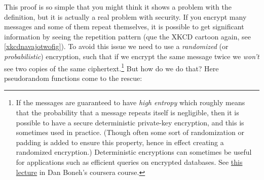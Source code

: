 This proof is so simple that you might think it shows a problem with the
definition, but it is actually a real problem with security. If you
encrypt many messages and some of them repeat themselves, it is possible
to get significant information by seeing the repetition pattern (que the
XKCD cartoon again, see \cref{xkcdnavajotwofig}). To avoid this issue we
need to use a \emph{randomized} (or \emph{probabilistic}) encryption,
such that if we encrypt the same message twice we \emph{won't} see two
copies of the same ciphertext.\footnote{If the messages are guaranteed
  to have \emph{high entropy} which roughly means that the probability
  that a message repeats itself is negligible, then it is possible to
  have a secure deterministic private-key encryption, and this is
  sometimes used in practice. (Though often some sort of randomization
  or padding is added to ensure this property, hence in effect creating
  a randomized encryption.) Deterministic encryptions can sometimes be
  useful for applications such as efficient queries on encrypted
  databases. See \href{https://goo.gl/GWJLFd}{this lecture} in Dan
  Boneh's coursera course.} But how do we do that? Here pseudorandom
functions come to the rescue:

\hypertarget{cpafromprfthm}{}

